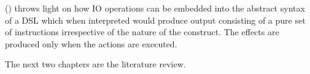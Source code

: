 \documentclass[thesis-solanki.tex]{subfiles}
\begin{document}
  () throws light on how IO operations can be embedded into the abstract
  syntax of a DSL which when interpreted would produce output consisting of a pure set of instructions irrespective
  of the nature of the construct.
  The effects are produced only when the actions are executed.

\begin{comment}
\section{Thesis Improved Contributions}\label{sec:thes-impr-contr}

\begin{enumerate}
\item Prototype 1 does
flattening language
opening up the language (binding monad)
adding custom variables
monadic unification (stuff happens in a bubble)
rec type $\rightarrow$ non rec type $\rightarrow$ fix non rec type isomorphically == rec type

You can make an Flatterm int

but you cannot make term int

adding quantifiers


\item Prototype 2 does
extends current prolog-0.2.0.1
this is to show that we can plug out approach into existing implementation and things work

\item Prototype 3 does
variable search strategy
what ever method you do for searching at the point of unification you can do it with our approach

\item Prototype 4 does
how can io be squeezed into this model where whenever the resolver encounters an io operation it generates a thunk (sort of unsolved
statement) which when executed would result in a side effect but till that point every thing is pure

\end{enumerate}
\end{comment}

The next two chapters are the literature review.

\ifMain\ifDraft
\begin{scope}
  \nolinenumbers
  \enotesize
  \par
  \begin{singlespace}
  \setlength{\parskip}{12pt plus 2pt minus 1pt}
  \theendnotes
  \par
  \end{singlespace}
\end{scope}
\fi\fi
\end{document}
